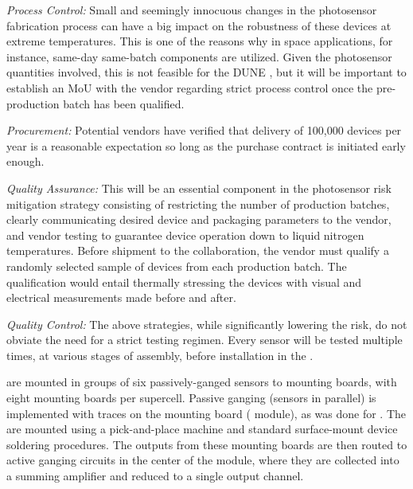 {\textit{Process Control:}} Small and seemingly innocuous
changes in the photosensor fabrication process can have a big impact on the robustness of these devices at extreme temperatures. This is one of the reasons why in space applications, for instance, same-day same-batch components are utilized. Given the photosensor quantities involved, this is not feasible for the DUNE , but
it will be important to establish an MoU with the vendor regarding 
strict process control once the pre-production batch has been qualified.

{\textit{Procurement:}} Potential vendors have verified that delivery of 100,000 devices per year is a reasonable expectation so long as the purchase contract is initiated early enough.

{\textit{Quality Assurance:}} This will be an essential component in the photosensor risk mitigation strategy consisting of restricting the number of production batches, clearly communicating desired device and packaging parameters to the vendor, and vendor testing to 
guarantee device operation down to liquid nitrogen temperatures.
Before shipment to the collaboration, the vendor 
must qualify a randomly selected sample of devices from each production batch. The qualification would entail thermally stressing the devices 
with visual and electrical measurements made before and after. 

{\textit{Quality Control:}} The above strategies, while significantly lowering the risk, do not obviate the need for a strict testing regimen. Every sensor will be tested multiple times, at various stages of assembly, before installation in the .

 are mounted in groups of six passively-ganged sensors to mounting boards, with eight mounting boards per supercell.  Passive ganging (sensors in parallel) is implemented with traces on the  mounting board ( module), %
as was done for .  The  are mounted using a pick-and-place machine and standard surface-mount device soldering procedures. The outputs from these mounting boards are then routed to active ganging circuits in the center of the  module, where they are collected into a summing amplifier and reduced to a single output channel.


